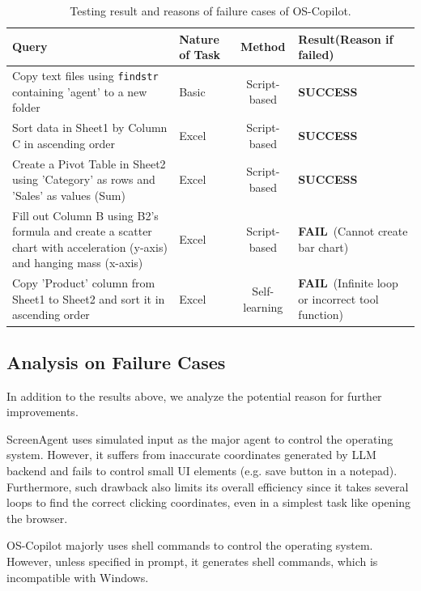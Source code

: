 \documentclass[11pt,letterpaper]{article}
\begin{document}
\begin{table}[ht]
    \centering
    \renewcommand{\arraystretch}{1.3}
    \begin{tabular}{|p{6cm}|p{2cm}|c|p{5cm}|}
        \hline
        \textbf{Query} & \textbf{Nature of Task} & \textbf{Method} & \textbf{Result(Reason if failed)} \\ 
        \hline
        Copy text files using \texttt{findstr} containing 'agent' to a new folder & Basic & Script-based & \textbf{SUCCESS} \\ 
        \hline
        Sort data in Sheet1 by Column C in ascending order & Excel & Script-based & \textbf{SUCCESS} \\ 
        \hline
        Create a Pivot Table in Sheet2 using 'Category' as rows and 'Sales' as values (Sum) & Excel & Script-based & \textbf{SUCCESS} \\ 
        \hline
        Fill out Column B using B2's formula and create a scatter chart with acceleration (y-axis) and hanging mass (x-axis) & Excel & Script-based & \textbf{FAIL}\ (Cannot create bar chart) \\ 
        \hline
        Copy 'Product' column from Sheet1 to Sheet2 and sort it in ascending order & Excel & Self-learning & \textbf{FAIL}\ (Infinite loop or incorrect tool function) \\ 
        \hline
    \end{tabular}
    \caption{Testing result and reasons of failure cases of OS-Copilot.}
    \label{table:excel_tasks}
\end{table}

\subsection{Analysis on Failure Cases}
In addition to the results above, we analyze the potential reason for further improvements.
%

%
ScreenAgent uses simulated input as the major agent to control the operating system. 
%
However, it suffers from inaccurate coordinates generated by LLM backend and fails to control small UI elements (e.g. save button in a notepad). 
%
Furthermore, such drawback also limits its overall efficiency since it takes several loops to find the correct clicking coordinates, even in a simplest task like opening the browser.
%

%
OS-Copilot majorly uses shell commands to control the operating system. 
%
However, unless specified in prompt, it generates shell commands, which is incompatible with Windows. 
%
\end{document}
